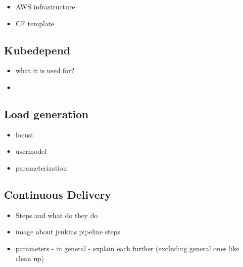 \begin{itemize}
	\item AWS infrastructure
	\item CF template
\end{itemize}

\subsection{Kubedepend}

\begin{itemize}
	\item what it is used for?
	\item 
\end{itemize}

\subsection{Load generation}

\begin{itemize}
	\item locust
	\item usermodel
	\item parameterization
\end{itemize}











\subsection{Continuous Delivery}

\begin{itemize}
	\item Steps and what do they do
	\item image about jenkins pipeline steps
	\item parameters - in general - explain each further (excluding general ones like clean up)
\end{itemize}
